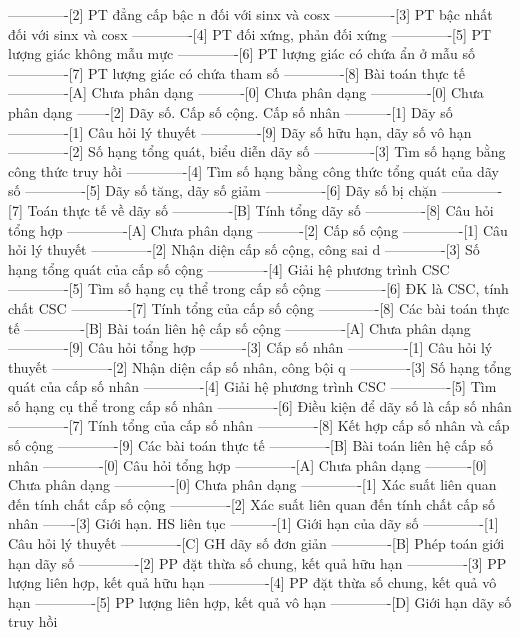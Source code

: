 -------------[2] PT đẳng cấp bậc n đối với sinx và cosx
-------------[3] PT bậc nhất đối với sinx và cosx
-------------[4] PT đối xứng, phản đối xứng
-------------[5] PT lượng giác không mẫu mực
-------------[6] PT lượng giác có chứa ẩn ở mẫu số
-------------[7] PT lượng giác có chứa tham số
-------------[8] Bài toán thực tế
-------------[A] Chưa phân dạng
----------[0] Chưa phân dạng
-------------[0] Chưa phân dạng
-------[2] Dãy số. Cấp số cộng. Cấp số nhân
----------[1] Dãy số
-------------[1] Câu hỏi lý thuyết
-------------[9] Dãy số hữu hạn, dãy số vô hạn
-------------[2] Số hạng tổng quát, biểu diễn dãy số
-------------[3] Tìm số hạng bằng công thức truy hồi
-------------[4] Tìm số hạng bằng công thức tổng quát của dãy số
-------------[5] Dãy số tăng, dãy số giảm
-------------[6] Dãy số bị chặn
-------------[7] Toán thực tế về dãy số
-------------[B] Tính tổng dãy số
-------------[8] Câu hỏi tổng hợp
-------------[A] Chưa phân dạng
----------[2] Cấp số cộng
-------------[1] Câu hỏi lý thuyết
-------------[2] Nhận diện cấp số cộng, công sai d
-------------[3] Số hạng tổng quát của cấp số cộng
-------------[4] Giải hệ phương trình CSC
-------------[5] Tìm số hạng cụ thể trong cấp số cộng
-------------[6] ĐK là CSC, tính chất CSC
-------------[7] Tính tổng của cấp số cộng
-------------[8] Các bài toán thực tế
-------------[B] Bài toán liên hệ cấp số cộng
-------------[A] Chưa phân dạng
-------------[9] Câu hỏi tổng hợp
----------[3] Cấp số nhân
-------------[1] Câu hỏi lý thuyết
-------------[2] Nhận diện cấp số nhân, công bội q
-------------[3] Số hạng tổng quát của cấp số nhân
-------------[4] Giải hệ phương trình CSC
-------------[5] Tìm số hạng cụ thể trong cấp số nhân
-------------[6] Điều kiện để dãy số là cấp số nhân
-------------[7] Tính tổng của cấp số nhân
-------------[8] Kết hợp cấp số nhân và cấp số cộng
-------------[9] Các bài toán thực tế
-------------[B] Bài toán liên hệ cấp số nhân
-------------[0] Câu hỏi tổng hợp
-------------[A] Chưa phân dạng
----------[0] Chưa phân dạng
-------------[0] Chưa phân dạng
-------------[1] Xác suất liên quan đến tính chất cấp số cộng
-------------[2] Xác suất liên quan đến tính chất cấp số nhân
-------[3] Giới hạn. HS liên tục
----------[1] Giới hạn của dãy số
-------------[1] Câu hỏi lý thuyết
-------------[C] GH dãy số đơn giản
-------------[B] Phép toán giới hạn dãy số
-------------[2] PP đặt thừa số chung, kết quả hữu hạn
-------------[3] PP lượng liên hợp, kết quả hữu hạn
-------------[4] PP đặt thừa số chung, kết quả vô hạn
-------------[5] PP lượng liên hợp, kết quả vô hạn
-------------[D] Giới hạn dãy số truy hồi
